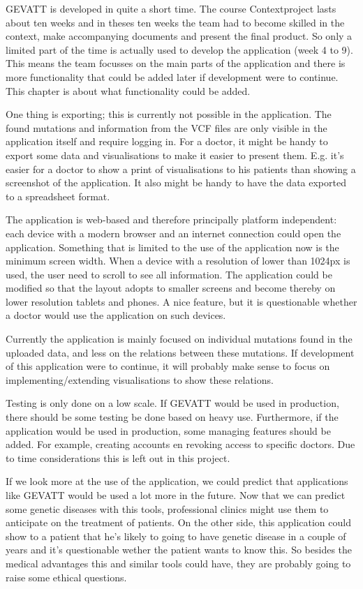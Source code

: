 GEVATT is developed in quite a short time. The course Contextproject lasts about ten weeks and in theses ten weeks the team had to become skilled in the context, make accompanying documents and present the final product. So only a limited part of the time is actually used to develop the application (week 4 to 9). This means the team focusses on the main parts of the application and there is more functionality that could be added later if development were to continue. This chapter is about what functionality could be added.

One thing is exporting; this is currently not possible in the application. The found mutations and information from the VCF files are only visible in the application itself and require logging in. For a doctor, it might be handy to export some data and visualisations to make it easier to present them. E.g. it's easier for a doctor to show a print of visualisations to his patients than showing a screenshot of the application. It also might be handy to have the data exported to a spreadsheet format.

The application is web-based and therefore principally platform independent: each device with a modern browser and an internet connection could open the application. Something that is limited to the use of the application now is the minimum screen width. When a device with a resolution of lower than 1024px is used, the user need to scroll to see all information. The application could be modified so that the layout adopts to smaller screens and become thereby on lower resolution tablets and phones. A nice feature, but it is questionable whether a doctor would use the application on such devices.

Currently the application is mainly focused on individual mutations found in the uploaded data, and less on the relations between these mutations. If development of this application were to continue, it will probably make sense to focus on implementing/extending visualisations to show these relations.

Testing is only done on a low scale. If GEVATT would be used in production, there should be some testing be done based on heavy use. Furthermore, if the application would be used in production, some managing features should be added. For example, creating accounts en revoking access to specific doctors. Due to time considerations this is left out in this project.

If we look more at the use of the application, we could predict that applications like GEVATT would be used a lot more in the future. Now that we can predict some genetic diseases with this tools, professional clinics might use them to anticipate on the treatment of patients. On the other side, this application could show to a patient that he's likely to going to have genetic disease in a couple of years and it's questionable wether the patient wants to know this. So besides the medical advantages this and similar tools could have, they are probably going to raise some ethical questions.